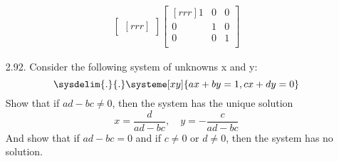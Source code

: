 \documentclass[12pt]{article}
\begin{document}
\begin{enumerate}
\begin{align*}
\begin{bmatrix}[rrr]
\end{bmatrix}
\begin{bmatrix}[rrr]
1 & 0 & 0\\
0 & 1 & 0\\
0 & 0 & 1\\
\end{bmatrix}
\end{align*}
\item [2.92.] Consider the following system of unknowns x and y:
\[ \sysdelim{.}{.}\systeme[xy]{ax+by=1,cx+dy=0} \]
Show that if $ad-bc \neq 0$, then the system has the unique solution
\[ x=\frac{d}{ad-bc}, \quad y=-\frac{c}{ad-bc} \]
And show that if $ad-bc=0$ and if $c \neq 0$ or $d \neq 0$, then the system has no solution.
\end{enumerate}
\end{document}
